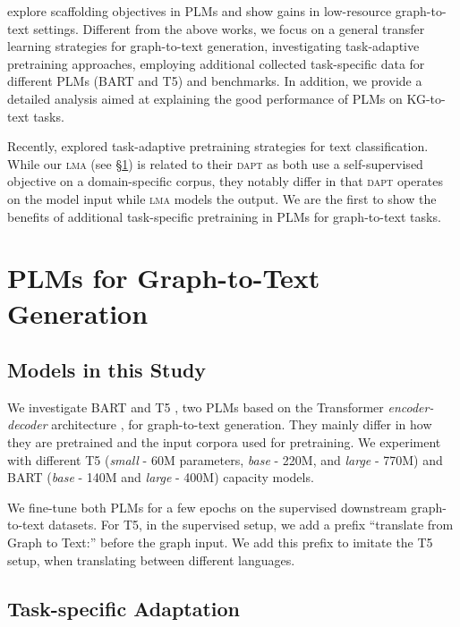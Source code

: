 \documentclass[11pt]{article}
\begin{document}
\citet{hoyle2020promoting} explore scaffolding objectives in PLMs and show gains in low-resource graph-to-text settings.
Different from the above works, we focus on a general transfer learning strategies for graph-to-text generation, investigating task-adaptive pretraining approaches, employing additional collected task-specific data for different PLMs (BART and T5) and benchmarks. In addition, we provide a detailed analysis aimed at explaining the good performance of PLMs on KG-to-text tasks.


Recently, \citet{gururangan-etal-2020-dont} explored task-adaptive pretraining strategies for text classification.
While our \textsc{lma} (see \S\ref{sec:finetuning}) is related to their \textsc{dapt} as both use a self-supervised objective on a domain-specific corpus,
they notably differ in that \textsc{dapt} operates on the model input while \textsc{lma} models the output. We are the first to show the benefits of additional task-specific pretraining in PLMs for graph-to-text tasks.




\section{PLMs for Graph-to-Text Generation}
\label{sec:finetuning}
\subsection{Models in this Study}
We investigate BART \cite{lewis2019bart} and T5 \cite{2019t5}, two PLMs based on the Transformer \emph{encoder-decoder} architecture \cite{NIPS2017_7181}, for graph-to-text generation. They mainly differ in how they are pretrained and the input corpora used for pretraining. We experiment with different T5 (\emph{small} - 60M  parameters, \emph{base} - 220M, and \emph{large} - 770M) and BART (\emph{base} - 140M and \emph{large} - 400M) capacity models.






We fine-tune both PLMs for a few epochs on the supervised downstream graph-to-text datasets. For T5, in the supervised setup, we add a prefix ``translate from Graph to Text:'' before the graph input. We add this prefix to imitate the T5 setup, when translating between different languages. 







\subsection{Task-specific Adaptation} 
\label{sec:domainpretraining}
\end{document}
